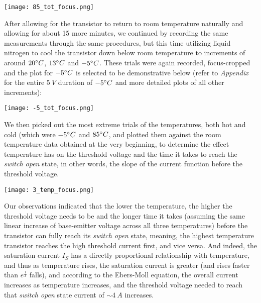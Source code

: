 \documentclass[10pt,letterpaper,onecolumn]{article}
\begin{document}
  \begin{center}
 \texttt{[image: 85\_tot\_focus.png]}
 \label{fig:85_focus}
 \end{center}

After allowing for the transistor to return to room temperature naturally and allowing for about 15 more minutes, we continued by recording the same measurements through the same procedures, but this time utilizing liquid nitrogen to cool the transistor down below room temperature to increments of around $20\degree C$, $13\degree C$ and $-5\degree C$. These trials were again recorded, focus-cropped and the plot for $-5\degree C$ is selected to be demonstrative below (refer to {\it Appendix} for the entire $5\ V$ duration of $-5\degree C$ and more detailed plots of all other increments):

 
 \begin{center}
 \texttt{[image: -5\_tot\_focus.png]}
 \label{fig:-5_focus}
 \end{center}

We then picked out the most extreme trials of the temperatures, both hot and cold (which were $-5\degree C$ and $85\degree C$, and plotted them against the room temperature data obtained at the very beginning, to determine the effect temperature has on the threshold voltage and the time it takes to reach the {\it switch open} state, in other words, the slope of the current function before the threshold voltage.


\begin{center}
 \texttt{[image: 3\_temp\_focus.png]}
 \label{fig:3_temp_focus}
\end{center}

Our observations indicated that the lower the temperature, the higher the threshold voltage needs to be and the longer time it takes (assuming the same linear increase of base-emitter voltage across all three temperatures) before the transistor can fully reach its {\it switch open} state, meaning, the highest temperature transistor reaches the high threshold current first, and vice versa. And indeed, the saturation current $I_S$ has a directly proportional relationship with temperature, and thus as temperature rises, the saturation current is greater (and rises faster than $e^{\frac{1}{T}}$ falls), and according to the Ebers-Moll equation, the overall current increases as temperature increases, and the threshold voltage needed to reach that {\it switch open} state current of $\sim 4\ A$ increases.
\end{document}
